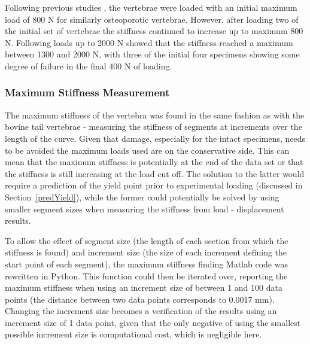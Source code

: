 Following previous studies \cite{Wijayathunga2008}, the vertebrae were loaded
with an initial maximum load of 800 N for similarly osteoporotic vertebrae.
However, after loading two of the initial set of vertebrae the stiffness
continued to increase up to maximum 800 N. Following loads up to 2000 N showed
that the stiffness reached a maximum between 1300 and 2000 N, with three of the
initial four specimens showing some degree of failure in the final 400 N of
loading.

\subsubsection{Maximum Stiffness Measurement}

The maximum stiffness of the vertebra was found in the same fashion as with the
bovine tail vertebrae - measuring the stiffness of segments at increments over
the length of the curve. Given that damage, especially for the intact
specimens,
needs to be avoided the maximum loads used are on the conservative side. This
can mean that the maximum stiffness is potentially at the end of the data set
or
that the stiffness is still increasing at the load cut off. The solution to the
latter would require a prediction of the yield point prior to experimental
loading (discussed in Section~\ref{predYield}), while the former could
potentially be solved by using smaller segment sizes when measuring the
stiffness from load - displacement results.

To allow the effect of segment size (the length of each section from which the
stiffness is found) and increment size (the size of each increment defining the
start point of each segment), the maximum stiffness finding Matlab code was
rewritten in Python. This function could then be iterated over, reporting the
maximum stiffness when using an increment size of between 1 and 100 data points
(the distance between two data points corresponds to 0.0017 mm). Changing the
increment size becomes a verification of the results using an increment size of
1 data point, given that the only negative of using the smallest possible
increment size is computational cost, which is negligible here.

